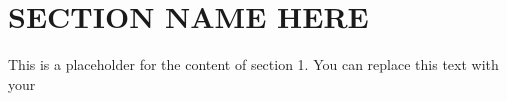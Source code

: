 \section{SECTION NAME HERE}

\begin{remark}
This is a placeholder for the content of section 1. You can replace this text with your
\end{remark}
